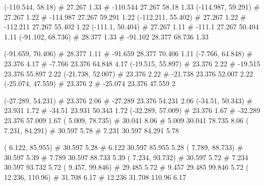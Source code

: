 \documentclass[a4paper,openbib,10pt]{article}
\newenvironment{treegraph}{\begin{graph}}{\end{graph}}
\begin{document}
\begin{treegraph}
  (-110.544, 58.18) #     27.267    1.33
   #    -110.544    27.267    58.18    1.33
  (-114.987, 59.291) #     27.267    1.22
   #    -114.987    27.267    59.291    1.22
  (-112.211, 55.402) #     27.267    1.22
   #    -112.211    27.267    55.402    1.22
  (-111.1, 50.404) #     27.267    1.11
   #    -111.1    27.267    50.404    1.11
  (-91.102, 68.736) #     28.377    1.33
   #    -91.102    28.377    68.736    1.33

  (-91.659, 70.406) #     28.377    1.11
   #    -91.659    28.377    70.406    1.11
  (-7.766, 64.848) #     23.376    4.17
   #    -7.766    23.376    64.848    4.17
  (-19.515, 55.897) #     23.376    2.22
   #    -19.515    23.376    55.897    2.22
  (-21.738, 52.007) #     23.376    2.22
   #    -21.738    23.376    52.007    2.22
  (-25.074, 47.559) #     23.376    2
   #    -25.074    23.376    47.559    2

  (-27.289, 54.231) #     23.376    2.06
   #    -27.289    23.376    54.231    2.06
  (-34.51, 50.343) #     23.931    1.72
   #    -34.51    23.931    50.343    1.72
  (-32.289, 57.009) #     23.376    1.67
   #    -32.289    23.376    57.009    1.67
  ( 5.009, 78.735) #     30.041    8.06
   #    5.009    30.041    78.735    8.06
  ( 7.231, 84.291) #     30.597    5.78
   #    7.231    30.597    84.291    5.78

  ( 6.122, 85.955) #     30.597    5.28
   #    6.122    30.597    85.955    5.28
  ( 7.789, 88.733) #     30.597    5.39
   #    7.789    30.597    88.733    5.39
  ( 7.234, 93.732) #     30.597    5.72
   #    7.234    30.597    93.732    5.72
  ( 9.457, 99.846) #     29.485    5.72
   #    9.457    29.485    99.846    5.72
  ( 12.236, 110.96) #     31.708    6.17
   #    12.236    31.708    110.96    6.17


\end{treegraph}
\end{document}
